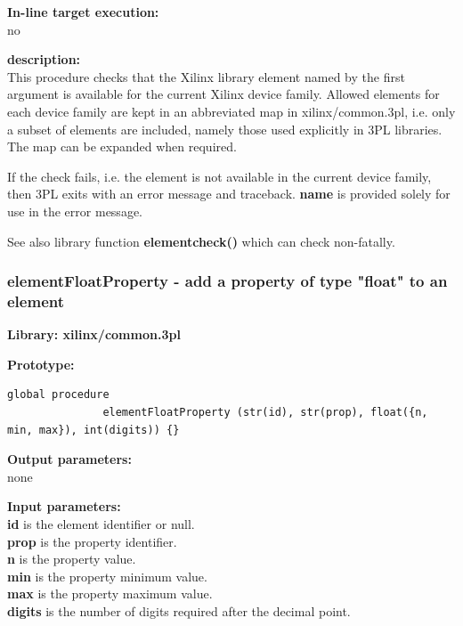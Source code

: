             {\bf In-line target execution:} \\
            no

            {\bf description:} \\
            This procedure checks that the Xilinx library element named by the first
            argument is available for the current Xilinx device family. Allowed elements
            for each device family are kept in an abbreviated map in xilinx/common.3pl,
            i.e. only a subset of elements are included, namely those used explicitly
            in 3PL libraries. The map can be expanded when required.
            
            If the check fails, i.e. the element is not available in the current device family,
            then 3PL exits with an error message and traceback. {\bf name} is provided solely
            for use in the error message.
            
            See also library function {\bf elementcheck()} 
            which can check non-fatally.




        \subsubsection{elementFloatProperty - add a property of type "float" to an element}\label{sec:lpelementFloatProperty}
            
            {\bf Library: xilinx/common.3pl}

            {\bf Prototype:} \\
            \vsp
            \begin{lstlisting}[gobble=12, language=threepl]
               global procedure
               elementFloatProperty (str(id), str(prop), float({n, min, max}), int(digits)) {}
            \end{lstlisting}

            {\bf Output parameters:} \\
            none

            {\bf Input parameters:} \\            
            {\bf id} is the element identifier or null.\\
            {\bf prop} is the property identifier.\\
            {\bf n} is the property value.\\
            {\bf min} is the property minimum value.\\
            {\bf max} is the property maximum value.\\
            {\bf digits} is the number of digits required after the decimal point.\\
        
